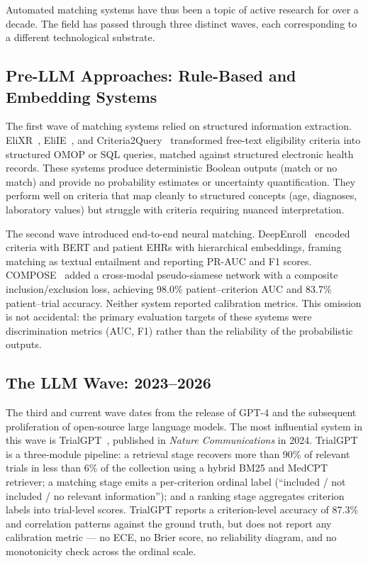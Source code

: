 Automated matching systems have thus been a topic of active research 
for over a decade. The field has passed through three distinct waves, 
each corresponding to a different technological substrate.

\subsection{Pre-LLM Approaches: Rule-Based and Embedding Systems}
\label{subsec:sota-prelm}

The first wave of matching systems relied on structured information 
extraction. EliXR~\cite{weng2011elixr}, EliIE~\cite{kang2017eliie}, and 
Criteria2Query~\cite{yuan2019criteria2query} transformed free-text 
eligibility criteria into structured OMOP or SQL queries, matched 
against structured electronic health records. These systems produce 
deterministic Boolean outputs (match or no match) and provide no 
probability estimates or uncertainty quantification. They perform well 
on criteria that map cleanly to structured concepts (age, diagnoses, 
laboratory values) but struggle with criteria requiring nuanced 
interpretation.

The second wave introduced end-to-end neural matching. 
DeepEnroll~\cite{zhang2020deepenroll} encoded criteria with BERT and 
patient EHRs with hierarchical embeddings, framing matching as textual 
entailment and reporting PR-AUC and F1 scores. 
COMPOSE~\cite{gao2020compose} added a cross-modal pseudo-siamese 
network with a composite inclusion/exclusion loss, achieving 98.0\% 
patient--criterion AUC and 83.7\% patient--trial accuracy. Neither 
system reported calibration metrics. This omission is not accidental: 
the primary evaluation targets of these systems were discrimination 
metrics (AUC, F1) rather than the reliability of the probabilistic 
outputs.

\subsection{The LLM Wave: 2023--2026}
\label{subsec:sota-llmwave}

The third and current wave dates from the release of GPT-4 and the 
subsequent proliferation of open-source large language models. The 
most influential system in this wave is 
TrialGPT~\cite{jin2024trialgpt}, published in \emph{Nature 
Communications} in 2024. TrialGPT is a three-module pipeline: a 
retrieval stage recovers more than 90\% of relevant trials in less 
than 6\% of the collection using a hybrid BM25 and MedCPT retriever; a 
matching stage emits a per-criterion ordinal label 
(``included / not included / no relevant information''); and a ranking 
stage aggregates criterion labels into trial-level scores. TrialGPT 
reports a criterion-level accuracy of 87.3\% and correlation patterns 
against the ground truth, but does not report any calibration 
metric --- no ECE, no Brier score, no reliability diagram, and no 
monotonicity check across the ordinal scale.

